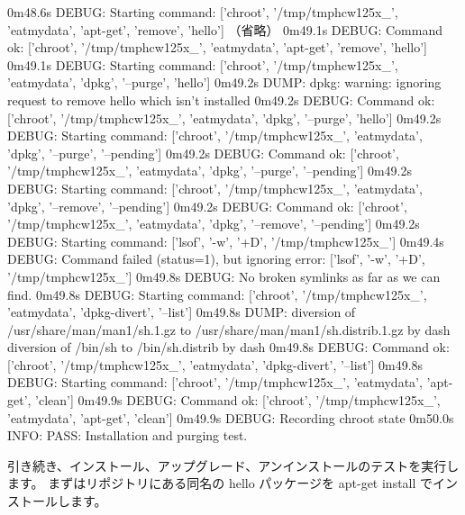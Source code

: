 \documentclass[mingoth,a4paper]{jsarticle}
\begin{document}
\begin{commandline}
0m48.6s DEBUG: Starting command: ['chroot', '/tmp/tmphcw125x_', 'eatmydata', 'apt-get',
'remove', 'hello']
  （省略）
0m49.1s DEBUG: Command ok: ['chroot', '/tmp/tmphcw125x_', 'eatmydata', 'apt-get', 'remove', 'hello']
0m49.1s DEBUG: Starting command: ['chroot', '/tmp/tmphcw125x_', 'eatmydata', 'dpkg', '--purge', 'hello']
0m49.2s DUMP:
  dpkg: warning: ignoring request to remove hello which isn't installed
0m49.2s DEBUG: Command ok: ['chroot', '/tmp/tmphcw125x_', 'eatmydata', 'dpkg', '--purge', 'hello']
0m49.2s DEBUG: Starting command: ['chroot', '/tmp/tmphcw125x_', 'eatmydata', 'dpkg', '--purge', '--pending']
0m49.2s DEBUG: Command ok: ['chroot', '/tmp/tmphcw125x_', 'eatmydata', 'dpkg', '--purge', '--pending']
0m49.2s DEBUG: Starting command: ['chroot', '/tmp/tmphcw125x_', 'eatmydata', 'dpkg', '--remove', '--pending']
0m49.2s DEBUG: Command ok: ['chroot', '/tmp/tmphcw125x_', 'eatmydata', 'dpkg', '--remove', '--pending']
0m49.2s DEBUG: Starting command: ['lsof', '-w', '+D', '/tmp/tmphcw125x_']
0m49.4s DEBUG: Command failed (status=1), but ignoring error: ['lsof', '-w', '+D', '/tmp/tmphcw125x_']
0m49.8s DEBUG: No broken symlinks as far as we can find.
0m49.8s DEBUG: Starting command: ['chroot', '/tmp/tmphcw125x_', 'eatmydata', 'dpkg-divert', '--list']
0m49.8s DUMP:
  diversion of /usr/share/man/man1/sh.1.gz to /usr/share/man/man1/sh.distrib.1.gz by dash
  diversion of /bin/sh to /bin/sh.distrib by dash
0m49.8s DEBUG: Command ok: ['chroot', '/tmp/tmphcw125x_', 'eatmydata', 'dpkg-divert', '--list']
0m49.8s DEBUG: Starting command: ['chroot', '/tmp/tmphcw125x_', 'eatmydata', 'apt-get', 'clean']
0m49.9s DEBUG: Command ok: ['chroot', '/tmp/tmphcw125x_', 'eatmydata', 'apt-get', 'clean']
0m49.9s DEBUG: Recording chroot state
0m50.0s INFO: PASS: Installation and purging test.
\end{commandline}

引き続き、インストール、アップグレード、アンインストールのテストを実行します。
まずはリポジトリにある同名の hello パッケージを apt-get install でインストールします。
\end{document}
